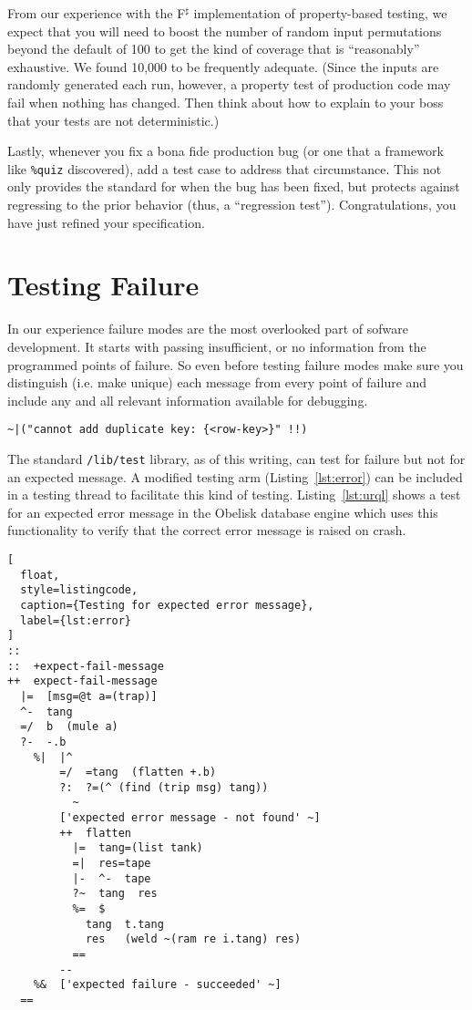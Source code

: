 \documentclass[twoside]{article}
\begin{document}
From our experience with the F{$^\sharp$} implementation of pro\-perty-based testing, we expect that you will need to boost the number of random input permutations beyond the default of 100 to get the kind of coverage that is ``reasonably'' exhaustive. We found 10,000 to be frequently adequate. (Since the inputs are randomly generated each run, however, a property test of production code may fail when nothing has changed. Then think about how to explain to your boss that your tests are not deterministic.)

Lastly, whenever you fix a bona fide production bug (or one that a framework like \texttt{\%quiz} discovered), add a test case to address that circumstance. This not only provides the standard for when the bug has been fixed, but protects against regressing to the prior behavior (thus, a “regression test”). Congratulations, you have just refined your specification.

\section{Testing Failure}

In our experience failure modes are the most overlooked part of sofware development. It starts with passing insufficient, or no information from the programmed points of failure. So even before testing failure modes make sure you distinguish (i.e. make unique) each message from every point of failure and include any and all relevant information available for debugging.

\begin{lstlisting}[style=listingcode]
~|("cannot add duplicate key: {<row-key>}" !!)
\end{lstlisting}

The standard \texttt{/lib/test} library, as of this writing, can test for failure but not for an expected message.  A modified testing arm (Listing~\ref{lst:error}) can be included in a testing thread to facilitate this kind of testing.  Listing~\ref{lst:urql} shows a test for an expected error message in the Obelisk database engine which uses this functionality to verify that the correct error message is raised on crash.

\begin{lstlisting}[
  float,
  style=listingcode,
  caption={Testing for expected error message},
  label={lst:error}
]
::
::  +expect-fail-message
++  expect-fail-message
  |=  [msg=@t a=(trap)]
  ^-  tang
  =/  b  (mule a)
  ?-  -.b
    %|  |^
        =/  =tang  (flatten +.b)
        ?:  ?=(^ (find (trip msg) tang))
          ~
        ['expected error message - not found' ~]
        ++  flatten
          |=  tang=(list tank)
          =|  res=tape
          |-  ^-  tape
          ?~  tang  res
          %=  $
            tang  t.tang
            res   (weld ~(ram re i.tang) res)
          ==
        --
    %&  ['expected failure - succeeded' ~]
  ==
\end{lstlisting}
\end{document}
